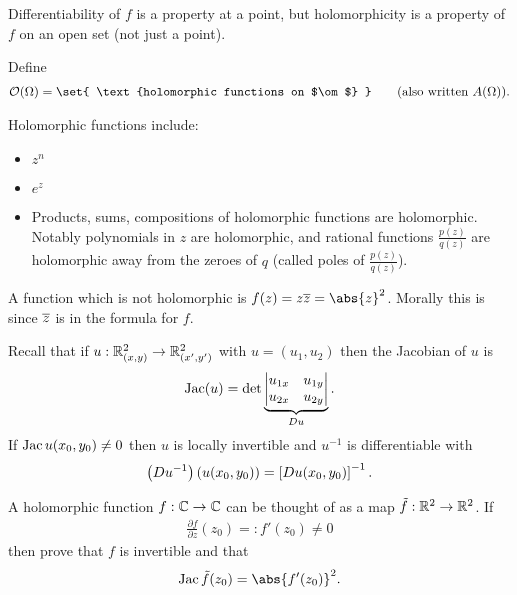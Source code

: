 \begin{note}
    Differentiability of $f$ is a property at a point, but holomorphicity is a property of $f$ on an open set (not just a point).
\end{note}

\begin{definition}
    Define
    \begin{align*}
        \O (\om) = \set{ \text{holomorphic functions on $\om$} } \qquad \text{(also written $A(\om)$)}.
    \end{align*}
\end{definition}

\begin{example}
    Holomorphic functions include:
    \begin{itemize}
        \item $z^n$
        \item $e^z$
        \item Products, sums, compositions of holomorphic functions are holomorphic. Notably polynomials in $z$ are holomorphic, and rational functions $\frac{p(z)}{q(z)}$ are holomorphic away from the zeroes of $q$ (called poles of $\frac{p(z)}{q(z)}$).
    \end{itemize}
\end{example}
\begin{nexample}
    A function which is not holomorphic is $f(z) = z \ov{z} = \abs{z}^2$. Morally this is since $\overline{z}$ is in the formula for $f$.
\end{nexample}

\begin{recall}
    Recall that if $u :\mathbb{R}^2_{(x,y)} \to \mathbb{R}^2_{(x',y')}$ with $u = (u_1,u_2)$ then the Jacobian of $u$ is
    \begin{align*}
        \operatorname{Jac}(u) = \det \underbrace{ \left| \begin{matrix}
            u_{1x} & u_{1y}\\
            u_{2x} & u_{2y}
        \end{matrix} \right| }_{Du}.
    \end{align*}
    If $\operatorname{Jac} u (x_0,y_0) \neq 0$ then $u $ is locally invertible and $u^{-1}$ is differentiable with
    \begin{align*}
        \left( Du^{-1}  \right) (u(x_0,y_0)) = \left[ Du(x_0,y_0) \right]^{-1}.
    \end{align*}
\end{recall}

\begin{exercise}
    A holomorphic function $f : \mathbb{C} \to \mathbb{C}$ can be thought of as a map $\tilde{f} : \mathbb{R}^2 \to \mathbb{R}^2$. If
    \begin{align*}
        \frac{\partial f}{\partial z} (z_0) =: f'(z_0) \neq 0
    \end{align*}
    then prove that $f$ is invertible and that
    \begin{align*}
        \jac \tilde{f} (z_0) = \abs{f'(z_0)}^2.
    \end{align*}
\end{exercise}

